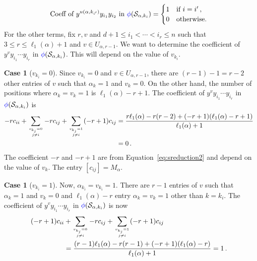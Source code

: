 \documentclass[12pt,reqno]{amsart}
\newcommand{\blue}[1]{\textcolor{blue}{#1}}
\theoremstyle{plain}
\theoremstyle{definition}
\newtheorem{case}[theorem]{Case}
\begin{document}
\begin{equation}\label{eq:coefr=2}
  \text{Coeff  of } y^{u(\alpha, k_{i'})} y_{i_1} y_{i_2} \text{ in  } \blue{\phi} (\mathcal{S}_{\alpha, k_{i}})  = 
  \begin{cases}
  	1 &\text{if } i=i'\,,\\
	0& \text{otherwise.}
  \end{cases}
  \end{equation}
For the other terms, fix $r, v$ and $d+1 \leq i_1 < \cdots < i_r \leq n$ such that $3 \leq r \leq \ell_1(\alpha)+1$ and  $v \in U_{\alpha,r-1}$.
We want to determine the coefficient of $y^{v} y_{i_1} \cdots y_{i_{r}}$ in $\blue{\phi} (\mathcal{S}_{\alpha, k_{i}}) $. This will depend on the value of $v_{k_i}$.

\begin{case}[{\it $v_{k_i}=0$}\null] \label{vk=0} 
Since $v_{k_i}=0$ and $v \in U_{\alpha,r-1}$, there are $(r-1)-1=r-2$ other entries of $v$ such that $\alpha_k=1$ and $v_k=0$.
On the other hand, the number of positions where $\alpha_k=v_k=1$ is $\ell_1(\alpha)-r+1$.
The coefficient of $y^{v} y_{i_1} \cdots y_{i_{r}}$ in $\blue{\phi} (\mathcal{S}_{\alpha, k_{i}}) $ is
\begin{align*}
 -rc_{ii}  + \sum_{v_{k_j}=0 \atop j\ne i}  -rc_{ij}   + \sum_{v_{k_j}=1 \atop j\ne i}  (-r+1)c_{ij}  
    &= \frac{r\ell_1(\alpha) -r(r-2) + (-r+1)(\ell_1(\alpha)-r+1)}{\ell_1(\alpha)+1} \\
    &= 0\,.
 \end{align*}
 The coefficient $-r$ and $-r+1$ are from Equation~\eqref{eq:sreduction2} and depend on the value of $v_k$. The entry $[c_{ij}]=M_\alpha$.
\end{case} 

\begin{case}[{\it $v_{k_i}=1$}\null] \label{vk=1} 
Now, $\alpha_{k_i}=v_{k_i}=1$. There are $r-1$ entries of $v$ such that $\alpha_k=1$ and $v_k=0$
and $\ell_1(\alpha)-r$ entry $\alpha_k=v_k=1$ other than $k=k_i$.
The coefficient of $y^{v} y_{i_1} \cdots y_{i_{r}}$ in $\blue{\phi} (\mathcal{S}_{\alpha, k_{i}}) $ is now
\begin{align*}
 (-r+1)c_{ii}  &+ \sum_{v_{k_j}=0 \atop j\ne i}  -rc_{ij}   + \sum_{v_{k_j}=1 \atop j\ne i}  (-r+1)c_{ij}  \\
    &= \frac{(r-1)\ell_1(\alpha) -r(r-1) + (-r+1)(\ell_1(\alpha)-r)}{\ell_1(\alpha)+1} 
    = 1\,.
 \end{align*}
\end{case}
 
\end{document}
